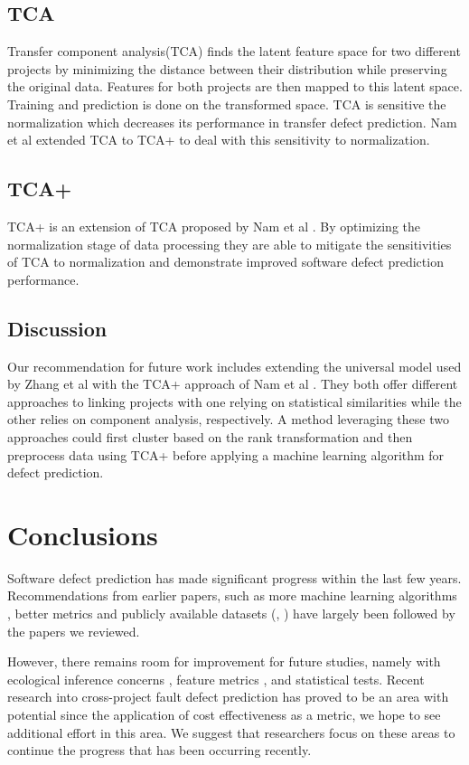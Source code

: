 \documentclass{sig-alternate-05-2015}
\begin{document}
\subsection{TCA}
Transfer component analysis(TCA) finds the latent feature space for two different projects by minimizing the distance between their distribution while preserving the original data. Features for both projects are then mapped to this latent space. Training and prediction is done on the transformed space. TCA is sensitive the normalization which decreases its performance in transfer defect prediction.  Nam et al \cite{Nam} extended TCA to TCA+ to deal with this sensitivity to normalization.

\subsection{TCA+}
TCA+ is an extension of TCA proposed by Nam et al \cite{Nam}. By optimizing the normalization stage of data processing they are able to mitigate the sensitivities of TCA to normalization and demonstrate improved software defect prediction performance.

\subsection{Discussion}
Our recommendation for future work includes extending the universal model used by Zhang et al \cite{Zhang2014} with the TCA+ approach of Nam et al \cite{Nam}. They both offer different approaches to linking projects with one relying on statistical similarities while the other relies on component analysis, respectively. A method leveraging these two approaches could first cluster based on the rank transformation and then preprocess data using TCA+ before applying a machine learning algorithm for defect prediction.

\section{Conclusions}
Software defect prediction has made significant progress within the last few years. Recommendations from earlier papers, such as more machine learning algorithms \cite{Catal}, better metrics \cite{Arisholm} and publicly available datasets (\cite{Catal}, \cite{Vandecruys}) have largely been followed by the papers we reviewed.  

However, there remains room for improvement for future studies, namely with ecological inference concerns \cite{Posnett}, feature metrics \cite{Hall}, and statistical tests.  Recent research into cross-project fault defect prediction has proved to be an area with potential since the application of cost effectiveness as a metric, we hope to see additional effort in this area.  We suggest that researchers focus on these areas to continue the progress that has been occurring recently. 
\end{document}
